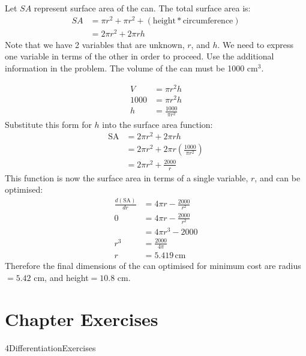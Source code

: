 Let $SA$ represent surface area of the can. The total surface area is:
\begin{align*}
SA&=\pi r^2 + \pi r^2 + \left(\textrm{height}*\textrm{circumference}\right)\\
&=2\pi r^2+2\pi rh
\end{align*}
Note that we have 2 variables that are unknown, $r$, and $h$. We need to express one variable in terms of the other in order to proceed. Use the additional information in the problem. The volume of the can must be 1000 cm$^3$.
\begin{multicols}{2}
\begin{align*}
V&=\pi r^2 h\\
1000&=\pi r^2 h\\
h&=\frac{1000}{\pi r^2}
\end{align*}
Substitute this form for $h$ into the surface area function:
\begin{align*}
\text{SA}&=2\pi r^2+2\pi rh\\
&=2\pi r^2+2\pi r\left(\frac{1000}{\pi r^2} \right)\\
&=2\pi r^2+\frac{2000}{r}
\end{align*}
This function is now the surface area in terms of a single variable, $r$, and can be optimised:
\begin{align*}
\frac{d(\text{SA})}{dr}&=4\pi r-\frac{2000}{r^2}\\
0&=4\pi r-\frac{2000}{r^2}\\
&=4\pi r^3-2000\\
r^3&=\frac{2000}{4\pi}\\
r&=5.419 \,\textrm{cm}
\end{align*}
Therefore the final dimensions of the can optimised for minimum cost are radius$=5.42$ cm, and height$=10.8$ cm. 	
\end{multicols}




 \section{Chapter Exercises}
 {4DifferentiationExercises}

